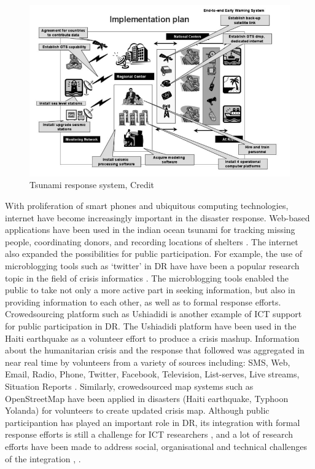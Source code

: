 \begin{figure}[h]
  \centering
  \includegraphics[width=1\textwidth]{img/Background/ICTExample}
  \caption{Tsunami response system, Credit \cite{Wattegama2012} }
  \label{fig:ICTExample}
\end{figure}

With proliferation of smart phones and ubiquitous computing technologies, internet have become increasingly important in the disaster response. Web-based applications have been used in the indian ocean tsunami for tracking missing people, coordinating donors, and recording locations of shelters \cite{Wattegama2012}. The internet also expanded the possibilities for public participation. For example, the use of microblogging tools such as `twitter' in \ac{DR} have have been a popular research topic in the field of crisis informatics \cite{Kogan2012,Sarcevic2012,Starbird2010}.  The microblogging tools enabled the public to take not only a more active part in seeking information, but also in providing information to each other, as well as to formal response efforts. Crowedsourcing platform such as Ushiadidi \cite{Morrow2011} is another example of \ac{ICT} support for public participation in \ac{DR}. The Ushiadidi platform have been used in the Haiti earthquake as a volunteer effort to produce a crisis mashup. Information about the humanitarian crisis and the response that followed was aggregated in near real time by volunteers from a variety of sources including: SMS, Web, Email, Radio, Phone, Twitter, Facebook, Television, List-serves, Live streams, Situation Reports \cite{Morrow2011}. Similarly, crowedsourced map systems such as OpenStreetMap \cite{Palen2015} have been applied in disasters (Haiti earthquake, Typhoon Yolanda) for volunteers to create updated crisis map. Although public participantion has played an important role in \ac{DR}, its integration with formal response efforts is still a challenge for \ac{ICT} researchers \cite{Palen2007}, and a lot of research efforts have been made to address social, organisational and technical challenges of the integration \cite{Dashti2014}, \cite{Sutton2008}.   \\

